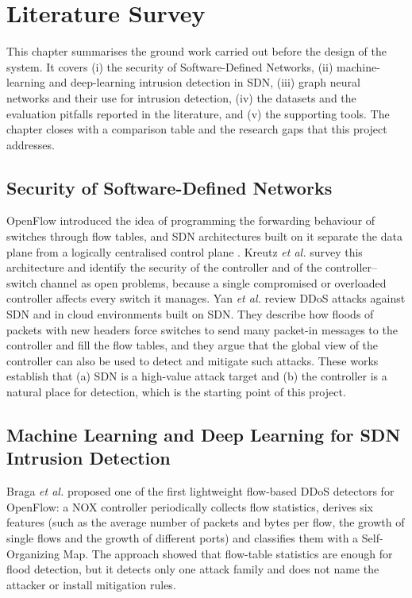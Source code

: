 \chapter{Literature Survey}

This chapter summarises the ground work carried out before the design of the system. It covers (i) the security of Software-Defined Networks, (ii) machine-learning and deep-learning intrusion detection in SDN, (iii) graph neural networks and their use for intrusion detection, (iv) the datasets and the evaluation pitfalls reported in the literature, and (v) the supporting tools. The chapter closes with a comparison table and the research gaps that this project addresses.

\section{Security of Software-Defined Networks}

OpenFlow \cite{bib:openflow} introduced the idea of programming the forwarding behaviour of switches through flow tables, and SDN architectures built on it separate the data plane from a logically centralised control plane \cite{bib:kreutz}. Kreutz \emph{et al.} survey this architecture and identify the security of the controller and of the controller--switch channel as open problems, because a single compromised or overloaded controller affects every switch it manages. Yan \emph{et al.} \cite{bib:yan} review DDoS attacks against SDN and in cloud environments built on SDN. They describe how floods of packets with new headers force switches to send many packet-in messages to the controller and fill the flow tables, and they argue that the global view of the controller can also be used to detect and mitigate such attacks. These works establish that (a) SDN is a high-value attack target and (b) the controller is a natural place for detection, which is the starting point of this project.

\section{Machine Learning and Deep Learning for SDN Intrusion Detection}

Braga \emph{et al.} \cite{bib:braga} proposed one of the first lightweight flow-based DDoS detectors for OpenFlow: a NOX controller periodically collects flow statistics, derives six features (such as the average number of packets and bytes per flow, the growth of single flows and the growth of different ports) and classifies them with a Self-Organizing Map. The approach showed that flow-table statistics are enough for flood detection, but it detects only one attack family and does not name the attacker or install mitigation rules.\\

